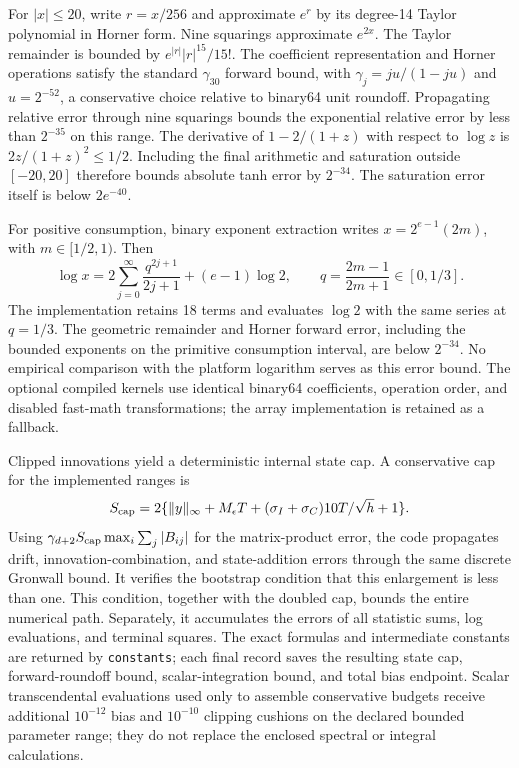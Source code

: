 For $|x|\leq20$, write $r=x/256$ and approximate $e^r$ by its degree-14 Taylor polynomial in Horner form. Nine squarings approximate $e^{2x}$. The Taylor remainder is bounded by
$e^{|r|}|r|^{15}/15!$. The coefficient representation and Horner operations satisfy the standard $\gamma_{30}$ forward bound, with $\gamma_j=ju/(1-ju)$ and $u=2^{-52}$, a conservative choice relative to binary64 unit roundoff. Propagating relative error through nine squarings bounds the exponential relative error by less than $2^{-35}$ on this range. The derivative of $1-2/(1+z)$ with respect to $\log z$ is $2z/(1+z)^2\leq1/2$. Including the final arithmetic and saturation outside $[-20,20]$ therefore bounds absolute tanh error by $2^{-34}$. The saturation error itself is below $2e^{-40}$.

For positive consumption, binary exponent extraction writes $x=2^{e-1}(2m)$, with $m\in[1/2,1)$. Then
\[
 \log x=2\sum_{j=0}^{\infty}\frac{q^{2j+1}}{2j+1}
                 +(e-1)\log2,\qquad q=\frac{2m-1}{2m+1}\in[0,1/3].
\]
The implementation retains 18 terms and evaluates $\log2$ with the same series at $q=1/3$. The geometric remainder and Horner forward error, including the bounded exponents on the primitive consumption interval, are below $2^{-34}$. No empirical comparison with the platform logarithm serves as this error bound. The optional compiled kernels use identical binary64 coefficients, operation order, and disabled fast-math transformations; the array implementation is retained as a fallback.

Clipped innovations yield a deterministic internal state cap. A conservative cap for the implemented ranges is
\[
 S_{\rm cap}=2\{\|y\|_\infty+M_\epsilon T+
           (\sigma_I+\sigma_C)10T/\sqrt h+1\}.
\]
Using $\gamma_{d+2}S_{\rm cap}\max_i\sum_j|B_{ij}|$ for the matrix-product error, the code propagates drift, innovation-combination, and state-addition errors through the same discrete Gronwall bound. It verifies the bootstrap condition that this enlargement is less than one. This condition, together with the doubled cap, bounds the entire numerical path. Separately, it accumulates the errors of all statistic sums, log evaluations, and terminal squares. The exact formulas and intermediate constants are returned by \texttt{constants}; each final record saves the resulting state cap, forward-roundoff bound, scalar-integration bound, and total bias endpoint. Scalar transcendental evaluations used only to assemble conservative budgets receive additional $10^{-12}$ bias and $10^{-10}$ clipping cushions on the declared bounded parameter range; they do not replace the enclosed spectral or integral calculations.

